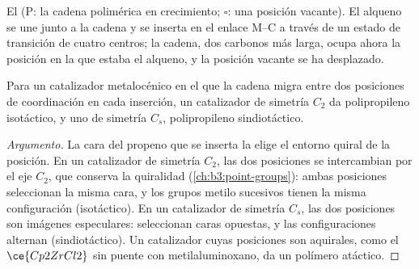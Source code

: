 \begin{omfigure}
\par\medskip

{\small El  (P: la cadena polimérica en crecimiento; $\square$: una
posición vacante). El alqueno se une junto a la cadena y se inserta en el enlace M--C
a través de un estado de transición de cuatro centros; la cadena, dos carbonos
más larga, ocupa ahora la posición en la que estaba el alqueno, y la posición vacante se ha
desplazado.}
\end{omfigure}

\begin{proposition}\label{prop:b3:homogeneous-catalysis:tacticity-symmetry}
Para un catalizador metalocénico en el que la cadena migra entre dos posiciones de coordinación
en cada inserción, un catalizador de simetría $C_2$ da polipropileno isotáctico, y uno de simetría $C_s$,
polipropileno sindiotáctico.
\end{proposition}

\begin{proof}[Argumento]
La cara del propeno que se inserta la elige el entorno quiral de la
posición. En un catalizador de simetría $C_2$, las dos posiciones se intercambian por el eje $C_2$,
que conserva la quiralidad (\cref{ch:b3:point-groups}): ambas posiciones seleccionan la
misma cara, y los grupos metilo sucesivos tienen la misma configuración (isotáctico).
En un catalizador de simetría $C_s$, las dos posiciones son imágenes especulares: seleccionan caras
opuestas, y las configuraciones alternan (sindiotáctico). Un catalizador cuyas posiciones
son aquirales, como el $\ce{Cp2ZrCl2}$ sin puente con metilaluminoxano, da un polímero
atáctico.
\end{proof}

